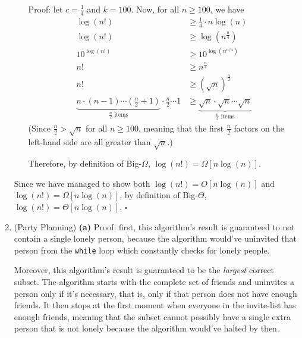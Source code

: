 \documentclass{article}
\begin{document}
\begin{enumerate}
\begin{itemize}
        Proof: let $c = \frac{1}{4}$ and $k = 100$. Now, for all $n \ge 100$, we have
        $$
          \begin{aligned}
            \log(n!)      & \ge \frac{1}{4} \cdot n\log(n)                                                      \\
            \log(n!)      & \ge \log(n^{\frac{n}{4}})                                                           \\
            10^{\log(n!)} & \ge 10^{\log(n^{n/4})}                                                              \\
            n!            & \ge n^\frac{n}{4}                                                                   \\
            n!            & \ge (\sqrt{n})^{\frac{n}{2}}                                                        \\
            \underbrace{n \cdot (n-1) \cdots (\frac{n}{2}+1)}_{\frac{n}{2}\text{ items}}
            \cdot \frac{n}{2} \cdots 1
                          & \ge \underbrace{\sqrt{n} \cdot \sqrt{n} \cdots \sqrt{n}}_{\frac{n}{2}\text{ items}}
          \end{aligned}
        $$
        (Since $\frac{n}{2} > \sqrt{n}$ for all $n \ge 100$, meaning that the first $\frac{n}{2}$ factors on the left-hand side are all greater than $\sqrt{n}$.)

        Therefore, by definition of Big-$\Omega$, $\log(n!) = \Omega[n\log(n)]$.
    \end{itemize}

    Since we have managed to show both $\log(n!) = O[n\log(n)]$ and $\log(n!) = \Omega[n\log(n)]$, by definition of Big-$\Theta$, $\log(n!) = \Theta[n\log(n)]$. $\square$

    \pagebreak

  \item (Party Planning) \textbf{(a)} Proof: first, this algorithm's result is guaranteed to not contain a single lonely person, because the algorithm would've uninvited that person from the \texttt{while} loop which constantly checks for lonely people.

    Moreover, this algorithm's result is guaranteed to be the \textit{largest} correct subset. The algorithm starts with the complete set of friends and uninvites a person only if it's necessary, that is, only if that person does not have enough friends. It then stops at the first moment when everyone in the invite-list has enough friends, meaning that the subset cannot possibly have a single extra person that is not lonely because the algorithm would've halted by then.


\end{enumerate}
\end{document}
